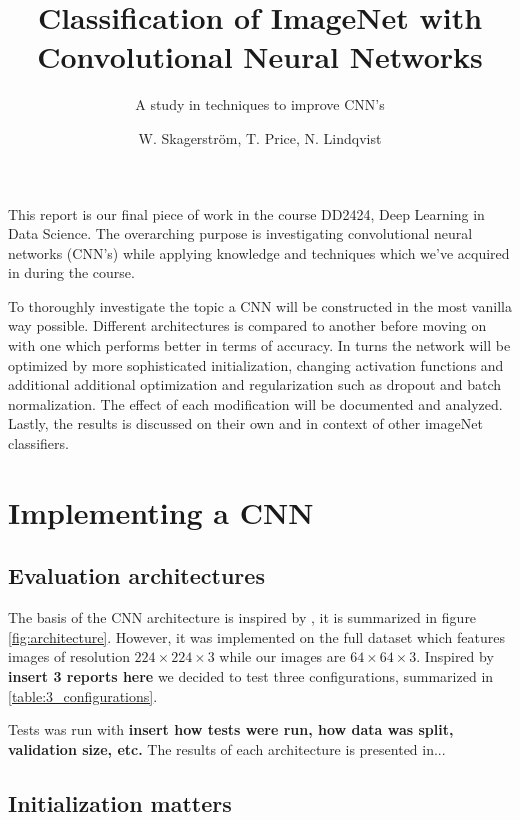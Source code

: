\documentclass{kthreport}
\title{Classification of ImageNet with Convolutional Neural Networks}
\subtitle{A study in techniques to improve CNN's}
\author{W. Skagerström, T. Price, N. Lindqvist}
\begin{document}
\maketitle


This report is our final piece of work in the course DD2424, Deep Learning in Data Science. The overarching purpose is investigating convolutional neural networks (CNN's) while applying knowledge and techniques which we've acquired in during the course.

To thoroughly investigate the topic a CNN will be constructed in the most vanilla way possible. Different architectures is compared to another before moving on with one which performs better in terms of accuracy. In turns the network will be optimized by more sophisticated initialization, changing activation functions and additional additional optimization and regularization such as dropout and batch normalization. The effect of each modification will be documented and analyzed. Lastly, the results is discussed on their own and in context of other imageNet classifiers.


\section{Implementing a CNN}

\subsection{Evaluation architectures}

The basis of the CNN architecture is inspired by \cite{NIPS2012_4824}, it is summarized in figure \ref{fig:architecture}. However, it was implemented on the full dataset which features images of resolution $224\times224\times3$ while our images are $64\times64\times3$. Inspired by \textbf{insert 3 reports here} we decided to test three configurations, summarized in \ref{table:3_configurations}.






Tests was run with \textbf{insert how tests were run, how data was split, validation size, etc.} The results of each architecture is presented in...

\subsection{Initialization matters}
\end{document}
